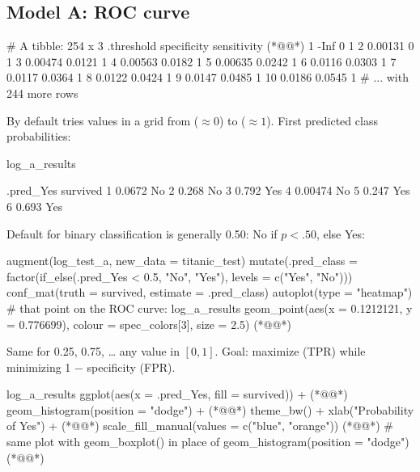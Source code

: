 \subsection{Model A: ROC curve}
\begin{routput}
# A tibble: 254 x 3
   .threshold specificity sensitivity      (*@@*)
 1 -Inf            0                1
 2    0.00131      0                1
 3    0.00474      0.0121           1
 4    0.00563      0.0182           1
 5    0.00635      0.0242           1
 6    0.0116       0.0303           1
 7    0.0117       0.0364           1
 8    0.0122       0.0424           1
 9    0.0147       0.0485           1
10    0.0186       0.0545           1
# ... with 244 more rows
\end{routput}
By default  tries  values in a grid from  ($\approx0$) to  ($\approx1$).
First predicted class probabilities:
\begin{rcode}
log_a_results %
\end{rcode}
\begin{routput}
  .pred_Yes survived
1   0.0672  No
2   0.268   No
3   0.792   Yes
4   0.00474 No
5   0.247   Yes
6   0.693   Yes
\end{routput}
Default  for binary classification is generally 0.50: No if $p<.50$, else Yes:
\begin{rcode}
augment(log_test_a, new_data = titanic_test) %
  mutate(.pred_class = factor(if_else(.pred_Yes < 0.5, "No", "Yes"), levels = c("Yes", "No"))) %
  conf_mat(truth = survived, estimate = .pred_class) %
  autoplot(type = "heatmap")
# that point on the ROC curve:
log_a_results %
  geom_point(aes(x = 0.1212121, y = 0.776699), colour = spec_colors[3], size = 2.5)  (*@@*)
\end{rcode}
Same for 0.25, 0.75, \ldots{} any value in $[0,1]$. Goal: maximize  (TPR) while minimizing
1 $-$ specificity (FPR).
\begin{rcode}
log_a_results %
  ggplot(aes(x = .pred_Yes, fill = survived)) +   (*@@*)
  geom_histogram(position = "dodge") +           (*@@*)
  theme_bw() + xlab("Probability of Yes") +       (*@@*)
  scale_fill_manual(values = c("blue", "orange")) (*@@*)
# same plot with geom_boxplot() in place of geom_histogram(position = "dodge")  (*@@*)
\end{rcode}

